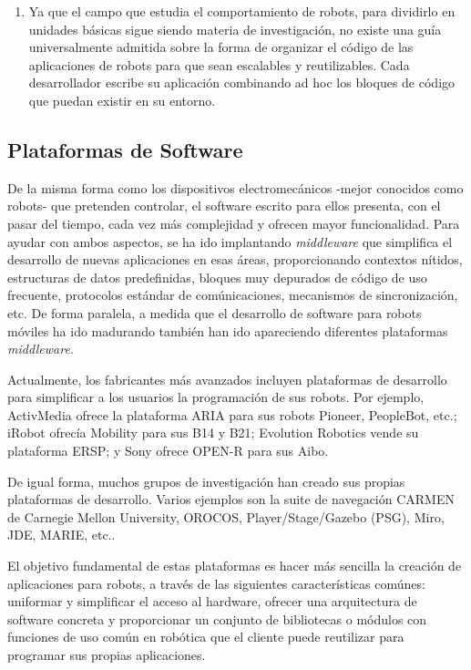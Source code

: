 \begin{enumerate}
	\item Ya que el campo que estudia el comportamiento de robots, para dividirlo en unidades básicas sigue siendo materia de investigación, no existe una guía universalmente admitida sobre la forma de organizar el código de las aplicaciones de robots para que sean escalables y reutilizables. Cada desarrollador escribe su aplicación combinando ad hoc los bloques de código que puedan existir en su entorno.
\end{enumerate}

\subsection{Plataformas de Software}

De la misma forma como los dispositivos electromecánicos -mejor conocidos como robots- que pretenden controlar, el software escrito para ellos presenta, con el pasar del tiempo, cada vez más complejidad y ofrecen mayor funcionalidad. Para ayudar con ambos aspectos, se ha ido implantando \textit{middleware} que simplifica el desarrollo de nuevas aplicaciones en esas áreas, proporcionando contextos nítidos, estructuras de datos predefinidas, bloques muy depurados de código de uso frecuente, protocolos estándar de comúnicaciones, mecanismos de sincronización, etc. De forma paralela, a medida que el desarrollo de software para robots móviles ha ido madurando también han ido apareciendo diferentes plataformas \textit{middleware}.

Actualmente, los fabricantes más avanzados incluyen plataformas de desarrollo para simplificar a los usuarios la programación de sus robots. Por ejemplo, ActivMedia ofrece la plataforma ARIA para sus robots Pioneer, PeopleBot, etc.; iRobot ofrecía Mobility para sus B14 y B21; Evolution Robotics vende su plataforma ERSP; y Sony ofrece OPEN-R para sus Aibo.

De igual forma, muchos grupos de investigación han creado sus propias plataformas de desarrollo. Varios ejemplos son la suite de navegación CARMEN de Carnegie Mellon University, OROCOS, Player/Stage/Gazebo (PSG), Miro, JDE, MARIE, etc..

El objetivo fundamental de estas plataformas es hacer más sencilla la creación de aplicaciones para robots, a través de las siguientes características comúnes: uniformar y simplificar el acceso al hardware, ofrecer una arquitectura de software concreta y proporcionar un conjunto de bibliotecas o módulos con funciones de uso común en robótica que el cliente puede reutilizar para programar sus propias aplicaciones.

